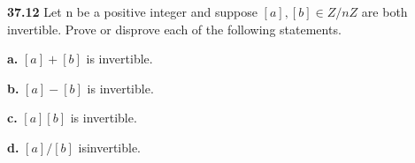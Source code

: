 \documentclass[10pt]{article}
\begin{document}
\pagebreak

\begin{framed}
    \textbf{37.12} Let n be a positive integer and suppose 
    $[a], [b] \in Z/nZ$ are both invertible. Prove or disprove
    each of the following statements. 
    
    \textbf{a.} $[a] + [b]$ is invertible.
    
    \textbf{b.} $[a] - [b]$ is invertible.
    
    \textbf{c.} $[a][b]$ is invertible.
    
    \textbf{d.} $[a]/[b]$ isinvertible.
\end{framed}
\end{document}
